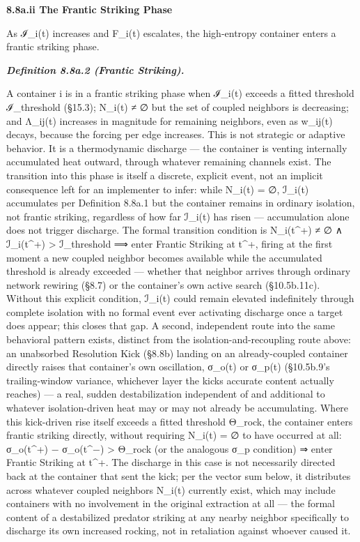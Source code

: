 \documentclass[
]{article}
\begin{document}
\textbf{8.8a.ii The Frantic Striking Phase}

As ℐ\_i(t) increases and F\_i(t) escalates, the high-entropy container
enters a frantic striking phase.

\emph{\textbf{Definition 8.8a.2 (Frantic Striking).}}

A container i is in a frantic striking phase when ℐ\_i(t) exceeds a
fitted threshold ℐ\_threshold (§15.3); N\_i(t) ≠ ∅ but the set of
coupled neighbors is decreasing; and Λ\_ij(t) increases in magnitude for
remaining neighbors, even as w\_ij(t) decays, because the forcing per
edge increases. This is not strategic or adaptive behavior. It is a
thermodynamic discharge --- the container is venting internally
accumulated heat outward, through whatever remaining channels exist. The
transition into this phase is itself a discrete, explicit event, not an
implicit consequence left for an implementer to infer: while N\_i(t) =
∅, ℐ\_i(t) accumulates per Definition 8.8a.1 but the container remains
in ordinary isolation, not frantic striking, regardless of how far
ℐ\_i(t) has risen --- accumulation alone does not trigger discharge. The
formal transition condition is N\_i(t\^{}+) ≠ ∅ ∧ ℐ\_i(t\^{}+)
\textgreater{} ℐ\_threshold ⟹ enter Frantic Striking at t\^{}+, firing
at the first moment a new coupled neighbor becomes available while the
accumulated threshold is already exceeded --- whether that neighbor
arrives through ordinary network rewiring (§8.7) or the container's own
active search (§10.5b.11c). Without this explicit condition, ℐ\_i(t)
could remain elevated indefinitely through complete isolation with no
formal event ever activating discharge once a target does appear; this
closes that gap. A second, independent route into the same behavioral
pattern exists, distinct from the isolation-and-recoupling route above:
an unabsorbed Resolution Kick (§8.8b) landing on an already-coupled
container directly raises that container's own oscillation, σ\_o(t) or
σ\_p(t) (§10.5b.9's trailing-window variance, whichever layer the kicks
accurate content actually reaches) --- a real, sudden destabilization
independent of and additional to whatever isolation-driven heat may or
may not already be accumulating. Where this kick-driven rise itself
exceeds a fitted threshold Θ\_rock, the container enters frantic
striking directly, without requiring N\_i(t) = ∅ to have occurred at
all: σ\_o(t\^{}+) − σ\_o(t\^{}−) \textgreater{} Θ\_rock (or the
analogous σ\_p condition) ⇒ enter Frantic Striking at t\^{}+. The
discharge in this case is not necessarily directed back at the container
that sent the kick; per the vector sum below, it distributes across
whatever coupled neighbors N\_i(t) currently exist, which may include
containers with no involvement in the original extraction at all --- the
formal content of a destabilized predator striking at any nearby
neighbor specifically to discharge its own increased rocking, not in
retaliation against whoever caused it.
\end{document}
